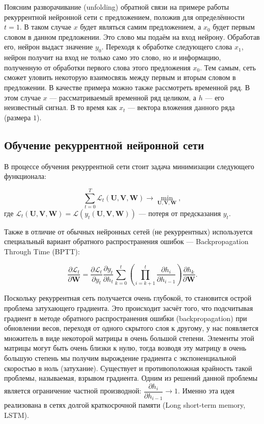 \documentclass[specialist,
               substylefile = spbu.rtx,
               subf, 
               colorlinks=true, 12pt]{disser}
\begin{document}
Поясним разворачивание (unfolding) обратной связи  на примере работы рекуррентной нейронной сети с предложением, положив для определённости $t = 1$. В таком случае $x$ будет являться самим предложением, а $x_0$ будет первым словом в данном предложении. Это слово мы подаём на вход нейрону. Обработав его, нейрон выдаст значение $y_0$. Переходя к обработке следующего слова $x_1$, нейрон получит на вход не только само это слово, но и информацию, полученную от обработки первого слова этого предложения $x_0$. Тем самым, сеть сможет уловить некоторую взаимосвязь между первым и вторым словом в предложении. В качестве примера можно также рассмотреть временной ряд. В этом случае $x$ --- рассматриваемый временной ряд целиком, а $h$ --- его неизвестный сигнал. В то время как $x_t$ --- вектора вложения данного ряда (размера $1$).

\subsection{Обучение рекуррентной нейронной сети}

В процессе обучения рекуррентной сети стоит задача минимизации следующего функционала:

\begin{equation*}
\sum_{t=0}^{T} \mathcal{L}_t (\mathbf{U}, \mathbf{V}, \mathbf{W}) \rightarrow \min_{\mathbf{U},\mathbf{ V}, \mathbf{W}},
\end{equation*}
где $\mathcal{L}_t (\mathbf{U}, \mathbf{V}, \mathbf{W}) = \mathcal{L} (y_t(\mathbf{U}, \mathbf{V}, \mathbf{W}))$ --- потеря от предсказания $y_t$.


Также в отличие от обычных нейронных сетей (не рекуррентных) используется специальный вариант обратного распространения ошибок --- Backpropagation Through Time (BPTT):

\begin{equation*}
\dfrac{\partial \mathcal{L}_t}{\partial \mathbf{W}} = \dfrac{\partial \mathcal{L}_t}{\partial y_t} \dfrac{\partial y_t}{\partial h_t} \sum_{k=0}^t \left( \prod_{i = k + 1}^t \dfrac{\partial h_i}{\partial h_{i-1}} \right) \dfrac{\partial h_k}{\partial \mathbf{W}}.
\end{equation*}

Поскольку рекуррентная сеть получается очень глубокой, то становится острой проблема затухающего градиента. Это происходит засчёт того, что подсчитывая градиент в методе обратного распространения ошибки (backpropagation) при обновлении весов, переходя от одного скрытого слоя к другому, у нас появляется множитель в виде некоторой матрицы в очень большой степени. Элементы этой матрицы могут быть очень близки к нулю, тогда возводя эту матрицу в очень большую степень мы получим вырождение градиента с экспоненциальной скоростью в ноль (затухание). Существует и противоположная крайность такой проблемы, называемая, взрывом градиента. Одним из решений данной проблемы является ограничение частной производной: $\dfrac{\partial h_i}{\partial h_{i-1}} \rightarrow 1.$ Именно эта идея реализована в сетях долгой краткосрочной памяти (Long short-term memory, LSTM).
\end{document}
